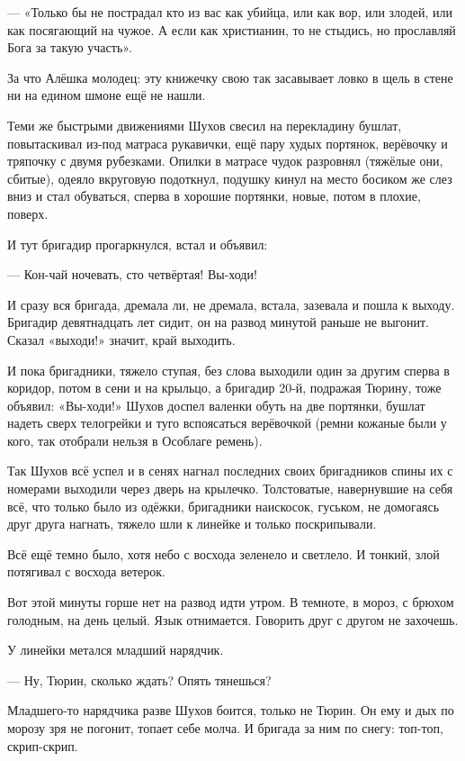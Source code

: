 --- «Только бы не пострадал кто из вас как убийца, или как вор, или злодей, или как посягающий
на чужое. А если как христианин, то не стыдись, но прославляй Бога за такую участь».

За что Алёшка молодец: эту книжечку свою так засавывает ловко в щель в стене \dash ни на едином
шмоне ещё не нашли.

Теми же быстрыми движениями Шухов свесил на перекладину бушлат, повытаскивал из-под матраса
рукавички, ещё пару худых портянок, верёвочку и тряпочку с двумя рубезками. Опилки в матрасе
чудок разровнял (тяжёлые они, сбитые), одеяло вкруговую подоткнул, подушку кинул на место \dash
босиком же слез вниз и стал обуваться, сперва в хорошие портянки, новые, потом в плохие,
поверх.

И тут бригадир прогаркнулся, встал и объявил:

--- Кон-чай ночевать, сто четвёртая! Вы-ходи!

И сразу вся бригада, дремала ли, не дремала, встала, зазевала и пошла к выходу. Бригадир
девятнадцать лет сидит, он на развод минутой раньше не выгонит. Сказал \dash «выходи!» \dash значит,
край выходить.

И пока бригадники, тяжело ступая, без слова выходили один за другим сперва в коридор, потом в
сени и на крыльцо, а бригадир 20-й, подражая Тюрину, тоже объявил: «Вы-ходи!» \dash Шухов доспел
валенки обуть на две портянки, бушлат надеть сверх телогрейки и туго вспоясаться верёвочкой
(ремни кожаные были у кого, так отобрали \dash нельзя в Особлаге ремень).

Так Шухов всё успел и в сенях нагнал последних своих бригадников \dash спины их с номерами
выходили через дверь на крылечко. Толстоватые, навернувшие на себя всё, что только было из
одёжки, бригадники наискосок, гуськом, не домогаясь друг друга нагнать, тяжело шли к линейке
и только поскрипывали.

Всё ещё темно было, хотя небо с восхода зеленело и светлело. И тонкий, злой потягивал с
восхода ветерок.

Вот этой минуты горше нет \dash на развод идти утром. В темноте, в мороз, с брюхом голодным, на
день целый. Язык отнимается. Говорить друг с другом не захочешь.

У линейки метался младший нарядчик.

--- Ну, Тюрин, сколько ждать? Опять тянешься?

Младшего-то нарядчика разве Шухов боится, только не Тюрин. Он ему и дых по морозу зря не
погонит, топает себе молча. И бригада за ним по снегу: топ-топ, скрип-скрип.


